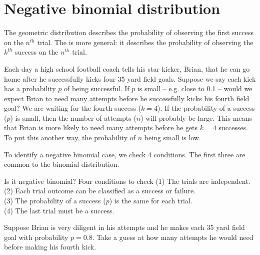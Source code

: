 {}




\section{Negative binomial distribution}
\label{negativeBinomial}


The geometric distribution describes the probability of observing the first success on the $n^{th}$ trial. The  is more general: it describes the probability of observing the $k^{th}$ success on the $n^{th}$ trial.

\begin{examplewrap}
\begin{nexample}{Each day a high school football coach tells his star kicker, Brian, that he can go home after he successfully kicks four 35 yard field goals. Suppose we say each kick has a probability $p$ of being successful. If $p$ is small -- e.g. close to 0.1 -- would we expect Brian to need many attempts before he successfully kicks his fourth field goal?}
We are waiting for the fourth success ($k=4$). If the probability of a success ($p$) is small, then the number of attempts ($n$) will probably be large. This means that Brian is more likely to need many attempts before he gets $k=4$ successes. To put this another way, the probability of $n$ being small is low.
\end{nexample}
\end{examplewrap}

To identify a negative binomial case, we check 4 conditions. The first three are common to the binomial distribution.

\begin{onebox}{Is it negative binomial? Four conditions to check}
(1) The trials are independent. \\
(2) Each trial outcome can be classified as a success or failure. \\
(3) The probability of a success ($p$) is the same for each trial. \\
(4) The last trial must be a success.
\end{onebox}

\begin{exercisewrap}
\begin{nexercise}
Suppose Brian is very diligent in his attempts and he makes each 35 yard field goal with probability $p=0.8$. Take a guess at how many attempts he would need before making his fourth kick.\footnotemark
\end{nexercise}
\end{exercisewrap}

